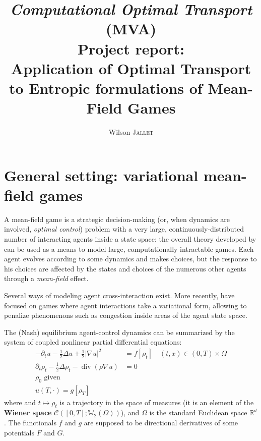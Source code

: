 \documentclass{article}
\author{Wilson \textsc{Jallet}}
\title{\textit{Computational Optimal Transport} (MVA)\\ \textsf{Project report:}\\
Application of Optimal Transport to Entropic formulations of Mean-Field Games}
\newcommand{\RR}{\mathbb{R}}
\newcommand{\WW}{\mathbb{W}}
\DeclareMathOperator{\divg}{div}
\begin{document}
    \maketitle
    
    \section{General setting: variational mean-field games}
    
    A mean-field game \cite{LASRY2006619,LASRY2006679} is a strategic decision-making (or, when dynamics are involved, \textit{optimal control}) problem with a very large, continuously-distributed number of interacting agents inside a state space: the overall theory developed by \citeauthor{LASRY2006619} can be used as a means to model large, computationally intractable games. Each agent evolves according to some dynamics and makes choices, but the response to his choices are affected by the states and choices of the numerous other agents through a \textit{mean-field} effect.
    
    Several ways of modeling agent cross-interaction exist. More recently, \cite{benamou:hal-01295299} have focused on games where agent interactions take a variational form, allowing to penalize phenomenons such as congestion inside areas of the agent state space.
    
    
    The (Nash) equilibrium agent-control dynamics can be summarized by the system of coupled nonlinear partial differential equations:
    \begin{subequations}\label{eq:VariationalQuadraticMFG}
    \begin{align}\label{eq:VarQuadMFGHJB}
    -\partial_t u - \frac{1}{2}\Delta u + \frac12|\nabla u|^2 &= f[\rho_t] \quad (t,x) \in  (0, T) \times \Omega \\\label{eq:VarQuadMFGKolmo}
    \partial_t \rho_t - \frac{1}{2}\Delta\rho_t - \divg(\rho\nabla u) &= 0 \\
    \rho_0 \text{ given} \\
    u(T, \cdot) = g[\rho_T]
    \end{align}	
    \end{subequations}
    where and $t\mapsto \rho_t$ is a trajectory in the space of measures (it is an element of the \textbf{Wiener space} $\mathcal{C}([0,T]; \WW_2(\Omega))$), and $\Omega$ is the standard Euclidean space $\RR^d$. The functionals $f$ and $g$ are supposed to be directional derivatives of some potentials $F$ and $G$.
    
\end{document}

